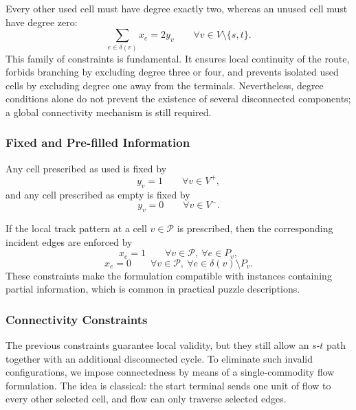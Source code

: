 Every other used cell must have degree exactly two, whereas an unused cell must have degree zero:
\begin{equation}
    \sum_{e \in \delta(v)} x_e = 2y_v
    \qquad \forall v \in V \setminus \{s,t\}.
    \label{eq:internal-degree}
\end{equation}
This family of constraints is fundamental. It ensures local continuity of the route, forbids branching by excluding degree three or four, and prevents isolated used cells by excluding degree one away from the terminals. Nevertheless, degree conditions alone do not prevent the existence of several disconnected components; a global connectivity mechanism is still required.

\subsubsection{Fixed and Pre-filled Information}

Any cell prescribed as used is fixed by
\begin{equation}
    y_v = 1
    \qquad \forall v \in V^{+},
    \label{eq:fixed-used}
\end{equation}
and any cell prescribed as empty is fixed by
\begin{equation}
    y_v = 0
    \qquad \forall v \in V^{-}.
    \label{eq:fixed-empty}
\end{equation}

If the local track pattern at a cell \(v \in \mathcal{P}\) is prescribed, then the corresponding incident edges are enforced by
\begin{equation}
    x_e = 1
    \qquad \forall v \in \mathcal{P},\ \forall e \in P_v,
    \label{eq:fixed-pattern-on}
\end{equation}
\begin{equation}
    x_e = 0
    \qquad \forall v \in \mathcal{P},\ \forall e \in \delta(v)\setminus P_v.
    \label{eq:fixed-pattern-off}
\end{equation}
These constraints make the formulation compatible with instances containing partial information, which is common in practical puzzle descriptions.

\subsubsection{Connectivity Constraints}

The previous constraints guarantee local validity, but they still allow an \(s\)-\(t\) path together with an additional disconnected cycle. To eliminate such invalid configurations, we impose connectedness by means of a single-commodity flow formulation. The idea is classical: the start terminal sends one unit of flow to every other selected cell, and flow can only traverse selected edges.

